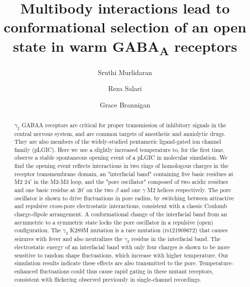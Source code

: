 \documentclass[journal=jacsat,manuscript=article]{achemso}
\author{Sruthi Murlidaran}
\author{Reza Salari}
\author{Grace Brannigan}
\title{Multibody interactions lead to conformational selection of an open state in warm GABA\textsubscript{A} receptors }
\begin{document}
\begin{abstract}$\gamma_2$
GABAA receptors are critical for proper transmission of inhibitory signals in the central nervous system, and are common targets of anesthetic and anxiolytic drugs. They are also members of the widely-studied pentameric ligand-gated ion channel family (pLGIC). Here we use a slightly increased temperature to, for the first time, observe a stable spontaneous opening event of a pLGIC in molecular simulation. We find the opening event reflects interactions in two rings of homologous charges in the receptor transmembrane domain, an "interfacial band" containing five basic residues at M2 24' in the M2-M3 loop, and the "pore oscillator" composed of two acidic residues and one basic residue at 20' on the two $\beta$ and one $\gamma$ M2 helices respectively. The pore oscillator is shown to drive fluctuations in pore radius, by switching between attractive and repulsive cross-pore electrostatic interactions, consistent with a classic Coulomb charge-dipole arrangement. A conformational change of the interfacial band from an asymmetric to a symmetric state locks the pore oscillator in a repulsive (open) configuration. The $\gamma_2$ K289M mutation is a rare mutation (rs121909672) that causes seizures with fever and also neutralizes the $\gamma_2$ residue in the interfacial band.  The electrostatic energy of an interfacial band with only four charges is shown to be more sensitive to random shape fluctuations, which increase with higher temperature. Our simulation results indicate these effects are also transmitted to the pore.  Temperature-enhanced fluctuations could thus cause rapid gating in these mutant receptors, consistent with flickering observed previously in single-channel recordings.
\end{abstract}
\end{document}
